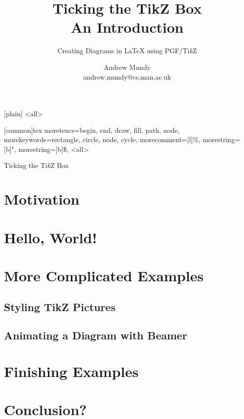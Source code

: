 \title{Ticking the TikZ Box \\An Introduction}
\subtitle{Creating Diagrams in \LaTeX{} using PGF/Ti\emph{k}Z}
\author{Andrew Mundy \\andrew.mundy@cs.man.ac.uk}

\usepackage{tikz}
\usepackage{caption}
\usepackage{subcaption}

[plain]
\captionsetup{labelformat=empty,textformat=empty,labelsep=none}
\mode
<all>

\usepackage{listings}
[common]{tex}{%
	moretexcs={begin, end, draw, fill, path, node},
	morekeywords={rectangle, circle, node, cycle},
	morecomment=[l]{\%},
	morestring=[b]{"},
	morestring=[b]{\$},
}
\lstset{
	numbers=left,
	numberstyle=\tiny,
	frame=tb,
}
\mode
<all>

\newcommand{\acaption}[1]{\only<article>{\caption{#1}}}
\newcommand{\alcaption}[1]{\only<article>{caption=#1,}}





\maketitle
\begin{frame}{Ticking the Ti\emph{k}Z Box}
	\tableofcontents
\end{frame}

\section{Motivation}

\section{Hello, World!}


\section{More Complicated Examples}
\subsection{Styling TikZ Pictures}


\subsection{Animating a Diagram with Beamer}

\section{Finishing Examples}

\section{Conclusion?}


